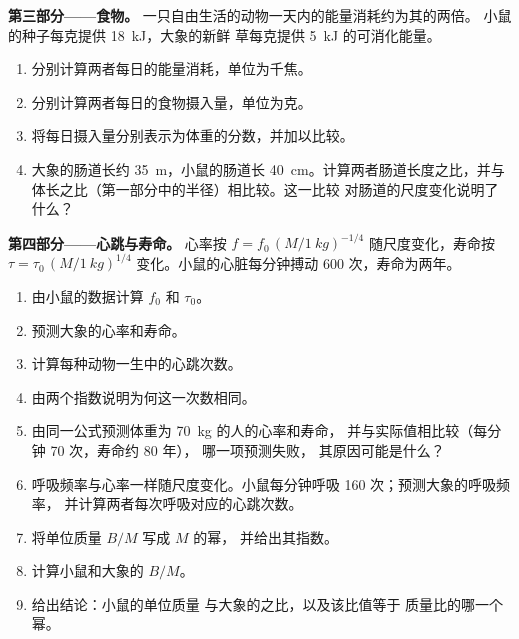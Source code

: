 \begin{problem}
\medskip
\noindent\textbf{第三部分——食物。}
一只自由生活的动物一天内的能量消耗约为其的两倍。
小鼠的种子每克提供 \qty{18}{kJ}，大象的新鲜
草每克提供 \qty{5}{kJ} 的可消化能量。
\begin{enumerate}[resume]
  \item 分别计算两者每日的能量消耗，单位为千焦。
  \item 分别计算两者每日的食物摄入量，单位为克。
  \item 将每日摄入量分别表示为体重的分数，并加以比较。
  \item 大象的肠道长约 \qty{35}{m}，小鼠的肠道长
        \qty{40}{cm}。计算两者肠道长度之比，并与
        体长之比（第一部分中的半径）相比较。这一比较
        对肠道的尺度变化说明了什么？
\end{enumerate}

\medskip
\noindent\textbf{第四部分——心跳与寿命。}
心率按 $f = f_0\,(M/\qty{1}{kg})^{-1/4}$ 随尺度变化，寿命按
$\tau = \tau_0\,(M/\qty{1}{kg})^{1/4}$ 变化。小鼠的心脏每分钟搏动
\qty{600}{} 次，寿命为两年。
\begin{enumerate}[resume]
  \item 由小鼠的数据计算 $f_0$ 和 $\tau_0$。
  \item 预测大象的心率和寿命。
  \item 计算每种动物一生中的心跳次数。
  \item 由两个指数说明为何这一次数相同。
  \item 由同一公式预测体重为 \qty{70}{kg} 的人的心率和寿命，
        并与实际值相比较（每分钟 \qty{70}{} 次，寿命约 \qty{80}{} 年），
        哪一项预测失败，
        其原因可能是什么？
  \item 呼吸频率与心率一样随尺度变化。小鼠每分钟呼吸
        \qty{160}{} 次；预测大象的呼吸频率，
        并计算两者每次呼吸对应的心跳次数。
  \item 将单位质量 $B/M$ 写成 $M$ 的幂，
        并给出其指数。
  \item 计算小鼠和大象的 $B/M$。
  \item 给出结论：小鼠的单位质量
        与大象的之比，以及该比值等于
        质量比的哪一个幂。
\end{enumerate}
\end{problem}

